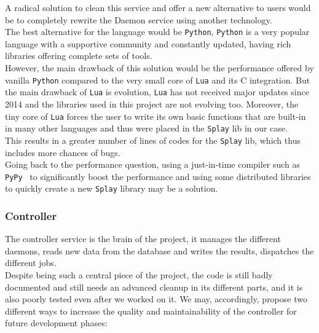 \documentclass{eplmastersthesis}
\begin{document}
          A radical solution to clean this service and offer a new alternative
          to users would be to completely rewrite the Daemon service using
          another technology.\\
          The best alternative for the language would be \texttt{Python}, \texttt{Python} is a
          very popular language with a supportive community and constantly
          updated, having rich libraries offering complete sets of tools.\\
          However, the main drawback of this solution would be the performance
          offered by vanilla \texttt{Python} compared to the very small core of \texttt{Lua} and
          its C integration. But the main drawback of \texttt{Lua} is evolution, \texttt{Lua} has
          not received major updates since 2014 and the libraries used in this
          project are not evolving too. Moreover, the tiny core of \texttt{Lua} forces
          the user to write its own basic functions that are built-in in many
          other languages and thus were placed in the \texttt{Splay} lib in our case.\\
          This results in a greater number of lines of codes for the \texttt{Splay} lib,
          which thus includes more chances of bugs.\\
          Going back to the performance question, using a just-in-time compiler
          such as \texttt{PyPy}~\cite{PyPy} to significantly boost the performance and
          using some distributed libraries to quickly create a new \texttt{Splay} library
          may be a solution.

        \subsubsection{Controller}

          The controller service is the brain of the project, it manages the
          different daemons, reads new data from the database and writes the
          results, dispatches the different jobs.\\
          Despite being such a central piece of the project, the code is still
          badly documented and still needs an advanced cleanup in its
          different parts, and it is also poorly tested even after we worked
          on it. We may, accordingly, propose two different ways to increase
          the quality and maintainability of the controller for future
          development phases:
\end{document}
